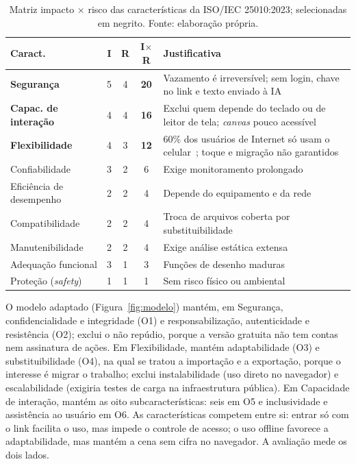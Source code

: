 \documentclass[conference]{IEEEtran}
\begin{document}
\begin{table}[!t]
\caption{Matriz impacto $\times$ risco das características da ISO/IEC 25010:2023; selecionadas em negrito. Fonte: elaboração própria.}
\label{tab:prior}
\centering
\scriptsize
\setlength{\tabcolsep}{2.5pt}
\begin{tabular}{@{}L{1.8cm} c c c L{4.5cm}@{}}
\toprule
\textbf{Caract.} & \textbf{I} & \textbf{R} & \textbf{I$\times$R} & \textbf{Justificativa}\\
\midrule
\textbf{Segurança} & 5 & 4 & \textbf{20} & Vazamento é irreversível; sem login, chave no link e texto enviado à IA\\
\textbf{Capac. de interação} & 4 & 4 & \textbf{16} & Exclui quem depende do teclado ou de leitor de tela; \textit{canvas} pouco acessível\\
\textbf{Flexibilidade} & 4 & 3 & \textbf{12} & 60\% dos usuários de Internet só usam o celular~\cite{nicbr25}; toque e migração não garantidos\\
Confiabilidade & 3 & 2 & 6 & Exige monitoramento prolongado\\
Eficiência de desempenho & 2 & 2 & 4 & Depende do equipamento e da rede\\
Compatibilidade & 2 & 2 & 4 & Troca de arquivos coberta por substituibilidade\\
Manutenibilidade & 2 & 2 & 4 & Exige análise estática extensa\\
Adequação funcional & 3 & 1 & 3 & Funções de desenho maduras\\
Proteção (\textit{safety}) & 1 & 1 & 1 & Sem risco físico ou ambiental\\
\bottomrule
\end{tabular}
\end{table}

O modelo adaptado (Figura~\ref{fig:modelo}) mantém, em Segurança,
confidencialidade e integridade (O1) e responsabilização, autenticidade e
resistência (O2); exclui o não repúdio, porque a versão gratuita não tem
contas nem assinatura de ações. Em Flexibilidade, mantém adaptabilidade (O3)
e substituibilidade (O4), na qual se tratou a importação e a exportação,
porque o interesse é migrar o trabalho; exclui instalabilidade (uso direto no
navegador) e escalabilidade (exigiria testes de carga na infraestrutura
pública). Em Capacidade de interação, mantém as oito subcaracterísticas: seis
em O5 e inclusividade e assistência ao usuário em O6. As características
competem entre si: entrar só com o link facilita o uso, mas impede o
controle de acesso; o uso offline favorece a adaptabilidade, mas mantém a
cena sem cifra no navegador. A avaliação mede os dois lados.
\end{document}
